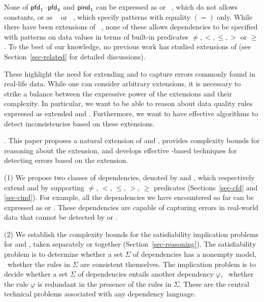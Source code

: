 \vspace{-0.5ex}

None of ${\mathsf{pfd}}_1$--${\mathsf{pfd}}_4$ and ${\mathsf{pind}}_1$
can be expressed as
\FDs or \INDs~\cite{AbHuVi1995}, which do not allows constants,
or as \CFDs~\cite{CFDs} or \CINDs~\cite{tcs-CINDs}, which specify
patterns with  equality $(=)$ only. While there have been
extensions of \CFDs~\cite{icde08,divesh08,ChenFM09}, none of these allows
dependencies to be specified with patterns on data values in terms of
built-in predicates $\ne, <, \le, >$ or $\ge$.  To the best of our
knowledge, no previous work has studied extensions of \CINDs
(see Section~\ref{sec-related} for detailed discussions).

These highlight the
need for extending \CFDs and \CINDs to capture errors
commonly found in real-life data.
While one can consider arbitrary extensions,
it is necessary to strike a balance between the expressive power
of the extensions and their complexity.
In particular, we want to be able to reason about data quality rules
expressed as extended \CFDs and \CINDs. Furthermore, we want to
have effective algorithms to detect inconsistencies
based on these extensions.


. This paper proposes
a natural extension of \CFDs and \CINDs, provides complexity
bounds for reasoning about the extension, and develops
effective \SQL-based techniques for detecting errors
based on the extension.

\sstab
\noindent(1) We propose two classes of dependencies, denoted by
\pCFDs and \pCINDs, which respectively extend \CFDs and \CINDs by supporting
$\ne$, $<$, $\le$, $>$, $\ge$ predicates (Sections~\ref{sec-cfd} and \ref{sec-cind}). For example, all
the dependencies we have encountered so far can be expressed as
\pCFDs or \pCINDs. These dependencies are capable of capturing
errors
in real-world data that cannot be detected by \CFDs or \CINDs.

\sstab
\noindent(2) We establish the complexity bounds for  the satisfiability
implication problems for \pCFDs and \pCINDs,
taken separately or together (Section~\ref{sec-reasoning}). The
satisfiability problem is to determine whether a set $\Sigma$ of
dependencies has a nonempty model, \ie~whether the rules in $\Sigma$
are consistent themselves. The implication problem is to decide whether
a set $\Sigma$ of dependencies entails another dependency $\varphi$,
\ie~whether the rule $\varphi$ is redundant in the presence of
the rules in $\Sigma$. These are the central technical problems
associated with any dependency language.

